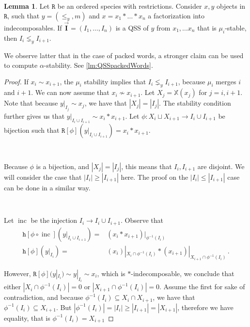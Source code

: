 \documentclass[12pt, reqno]{amsart}
\theoremstyle{definition}
\newtheorem{lm}[thm]{Lemma}
\newcommand{\III}{\vec{\mathbf{I}}}
\DeclareMathOperator{\inc}{\mathrm{inc}}
\begin{document}
\begin{lm}\label{obs:pwords-characterisation}
Let $\mathtt{R}$ be an ordered species with restrictions.
Consider $x, y$ objects in $\mathtt{R}$, such that $y = (\leq_y, m)$ and $x = x_1\ast \dots \ast x_n$ a factorization into indecomposables.
If $\III = (I_1, \dots, I_n)$ is a QSS of $y$ from $x_1, \dots x_n$ that is $\mu_i$-stable, then $I_i \lneq_y I_{i+1}$.
\end{lm}


We observe latter that in the case of packed words, a stronger claim can be used to compute $\alpha$-stability.
See \cref{lm:QSSpackedWords}.

\begin{proof}
If $x_i \sim x_{i+1}$, the $\mu_i$ stability implies that $I_i \lneq_y I_{i+1}$, because $\mu_i$ merges $i$ and $i+1$.
We can now assume that $x_i \not\sim x_{i+1}$.
Let $X_j = \mathbb{X}(x_j)$ for $j = i, i+1$.
Note that because $y|_{I_j} \sim x_j$, we have that $|X_j| = |I_j|$.
The stability condition further gives us that $y|_{I_i \cup I_{i+1}} \sim x_i \ast x_{i+1}$.
Let $\phi : X_i \sqcup X_{i+1} \to  I_i \cup I_{i+1}$ be bijection such that $\mathtt{R}[\phi](y|_{ I_i \cup I_{i+1}}) = x_i \ast x_{i+1}$.

\

Because $\phi$ is a bijection, and $|X_j| = |I_j|$, this means that $I_i, I_{i+1}$ are disjoint.
We will consider the case that $|I_i| \geq |I_{i+1}|$ here.
The proof on the $|I_i| \leq |I_{i+1}|$ case can be done in a similar way.

\

Let $\inc $ be the injection $I_i \to I_i \cup I_{i+1}$.
Observe that
\begin{equation}\label{eq:lmonPWo}
    \begin{split}
        \mathtt{h}[\phi \circ \inc](y|_{I_i \cup I_{i+1}}) =& (x_i \ast x_{i+1})|_{\phi^{-1}(I_i)}\\
        \mathtt{h}[\phi](y|_{I_i}) =& (x_i)|_{X_i \cap \phi^{-1}(I_i)} \ast (x_{i+1})|_{X_{i+1} \cap \phi^{-1}(I_i)}\, .
    \end{split}
\end{equation}

However, $\mathtt{R}[\phi](y|_{I_i}) \sim y|_{I_i} \sim x_i$, which is $\ast$-indecomposable, we conclude that either $|X_i \cap \phi^{-1}(I_i)| = 0 $ or $|X_{i+1} \cap \phi^{-1}(I_i)| = 0$.
Assume the first for sake of contradiction, and because $\phi^{-1}(I_i) \subseteq X_i \cap X_{i+1}$, we have that $\phi^{-1}(I_i) \subseteq X_{i+1}$.
But $|\phi^{-1}(I_i)| = |I_i| \geq |I_{i+1}| = |X_{i+1}|$, therefore we have equality, that is $\phi^{-1}(I_i) = X_{i+1}$


\end{proof}
\end{document}
